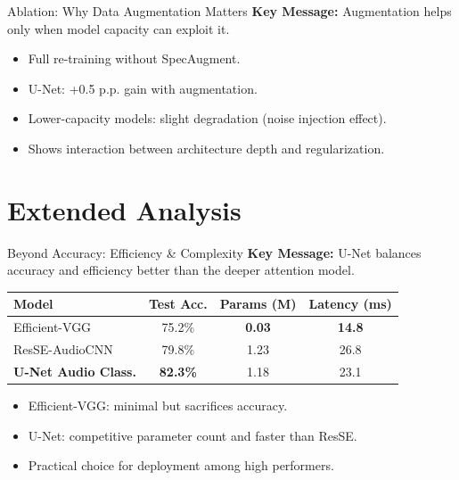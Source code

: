\documentclass[aspectratio=169,xcolor=dvipsnames]{beamer}
\begin{document}
\begin{frame}{Ablation: Why Data Augmentation Matters}
  \textbf{Key Message:} Augmentation helps only when model capacity can exploit it.\\[4pt]
  \begin{itemize}
    \item Full re-training without SpecAugment.
    \item U-Net: +0.5 p.p. gain with augmentation.
    \item Lower-capacity models: slight degradation (noise injection effect).
    \item Shows interaction between architecture depth and regularization.
  \end{itemize}
  \vspace{0.2cm}
  \begin{center}
  \end{center}
\end{frame}

\section{Extended Analysis}
\begin{frame}{Beyond Accuracy: Efficiency \& Complexity}
  \textbf{Key Message:} U-Net balances accuracy and efficiency better than the deeper attention model.\\[4pt]
  \begin{table}[h]
    \centering
    \begin{tabular}{lccc}
      \toprule
      Model & Test Acc. & Params (M) & Latency (ms) \\
      \midrule
      Efficient-VGG & 75.2\% & \textbf{0.03} & \textbf{14.8} \\
      ResSE-AudioCNN & 79.8\% & 1.23 & 26.8 \\
      \textbf{U-Net Audio Class.} & \textbf{82.3\%} & 1.18 & 23.1 \\
      \bottomrule
    \end{tabular}
  \end{table}
  \vspace{0.15cm}
  \begin{itemize}
    \item Efficient-VGG: minimal but sacrifices accuracy.
    \item U-Net: competitive parameter count and faster than ResSE.
    \item Practical choice for deployment among high performers.
  \end{itemize}
\end{frame}
\end{document}
